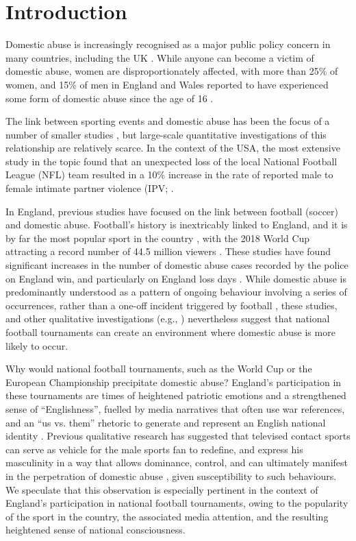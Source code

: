\documentclass[12pt, a4paper]{article}
\begin{document}
\newpage
\RaggedRight
\section{Introduction}


Domestic abuse is increasingly recognised as a major public policy concern in many countries, including the UK \cite{ep}. While anyone can become a victim of domestic abuse, women are disproportionately affected, with more than 25\% of women, and 15\% of men in England and Wales reported to have experienced some form of domestic abuse since the age of 16 \cite{ONS}.

The link between sporting events and domestic abuse has been the focus of a number of smaller studies \cite{Williams2014}, but large-scale quantitative investigations of this relationship are relatively scarce. In the context of the USA, the most extensive study in the topic found that an unexpected loss of the local National Football League (NFL) team resulted in a 10\% increase in the rate of reported male to female intimate partner violence (IPV; .

In England, previous studies have focused on the link between football (soccer) and domestic abuse. Football's history is inextricably linked to England, and it is by far the most popular sport in the country \cite{Parry2014}, with the 2018 World Cup attracting a record number of 44.5 million viewers \cite{BBC}. These studies have found significant increases in the number of domestic abuse cases recorded by the police on England win, and particularly on England loss days \cite{Brimicombe2012, Kirby2014}. While domestic abuse is predominantly understood as a pattern of ongoing behaviour involving a series of occurrences, rather than a one-off incident triggered by football \cite{Brooks-Hay2018}, these studies, and other qualitative investigations (e.g., ) nevertheless suggest that national football tournaments can create an environment where domestic abuse is more likely to occur.




Why would national football tournaments, such as the World Cup or the European Championship precipitate domestic abuse? England's participation in these tournaments are times of heightened patriotic emotions and a strengthened sense of ``Englishness'', fuelled by media narratives that often use war references, and an ``us vs. them'' rhetoric to generate and represent an English national identity \cite{Vincent2014}. Previous qualitative research has suggested that televised contact sports can serve as vehicle for the male sports fan to redefine, and express his masculinity in a way that allows dominance, control, and can ultimately manifest in the perpetration of domestic abuse \cite{Sabo,Swallow}, given susceptibility to such behaviours. We speculate that this observation is especially pertinent in the context of England's participation in national football tournaments, owing to the popularity of the sport in the country, the associated media attention, and the resulting heightened sense of national consciousness. 
\end{document}
